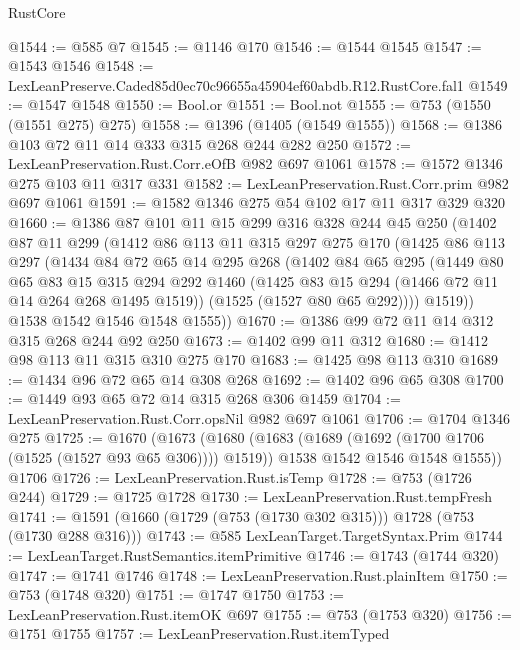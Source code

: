 \begin{lexlean}{RustCore}
\begin{coremodule}
@1544 := @585 @7
@1545 := @1146 @170
@1546 := @1544 @1545
@1547 := @1543 @1546
@1548 := LexLeanPreserve.Caded85d0ec70c96655a45904ef60abdb.R12.RustCore.fal1
@1549 := @1547 @1548
@1550 := Bool.or
@1551 := Bool.not
@1555 := @753 (@1550 (@1551 @275) @275)
@1558 := @1396 (@1405 (@1549 @1555))
@1568 := @1386 @103 @72 @11 @14 @333 @315 @268 @244 @282 @250
@1572 := LexLeanPreservation.Rust.Corr.eOfB @982 @697 @1061
@1578 := @1572 @1346 @275 @103 @11 @317 @331
@1582 := LexLeanPreservation.Rust.Corr.prim @982 @697 @1061
@1591 := @1582 @1346 @275 @54 @102 @17 @11 @317 @329 @320
@1660 := @1386
    @87
    @101
    @11
    @15
    @299
    @316
    @328
    @244
    @45
    @250
    (@1402
      @87
      @11
      @299
      (@1412
        @86
        @113
        @11
        @315
        @297
        @275
        @170
        (@1425
          @86
          @113
          @297
          (@1434
            @84
            @72
            @65
            @14
            @295
            @268
            (@1402
              @84
              @65
              @295
              (@1449
                @80
                @65
                @83
                @15
                @315
                @294
                @292
                @1460
                (@1425 @83 @15 @294 (@1466 @72 @11 @14 @264 @268 @1495 @1519))
                (@1525 (@1527 @80 @65 @292))))
            @1519))
        @1538
        @1542
        @1546
        @1548
        @1555))
@1670 := @1386 @99 @72 @11 @14 @312 @315 @268 @244 @92 @250
@1673 := @1402 @99 @11 @312
@1680 := @1412 @98 @113 @11 @315 @310 @275 @170
@1683 := @1425 @98 @113 @310
@1689 := @1434 @96 @72 @65 @14 @308 @268
@1692 := @1402 @96 @65 @308
@1700 := @1449 @93 @65 @72 @14 @315 @268 @306 @1459
@1704 := LexLeanPreservation.Rust.Corr.opsNil @982 @697 @1061
@1706 := @1704 @1346 @275
@1725 := @1670
    (@1673
      (@1680
        (@1683 (@1689 (@1692 (@1700 @1706 (@1525 (@1527 @93 @65 @306)))) @1519))
        @1538
        @1542
        @1546
        @1548
        @1555))
    @1706
@1726 := LexLeanPreservation.Rust.isTemp
@1728 := @753 (@1726 @244)
@1729 := @1725 @1728
@1730 := LexLeanPreservation.Rust.tempFresh
@1741 := @1591 (@1660 (@1729 (@753 (@1730 @302 @315))) @1728 (@753 (@1730 @288 @316)))
@1743 := @585 LexLeanTarget.TargetSyntax.Prim
@1744 := LexLeanTarget.RustSemantics.itemPrimitive
@1746 := @1743 (@1744 @320)
@1747 := @1741 @1746
@1748 := LexLeanPreservation.Rust.plainItem
@1750 := @753 (@1748 @320)
@1751 := @1747 @1750
@1753 := LexLeanPreservation.Rust.itemOK @697
@1755 := @753 (@1753 @320)
@1756 := @1751 @1755
@1757 := LexLeanPreservation.Rust.itemTyped

\end{coremodule}
\end{lexlean}
